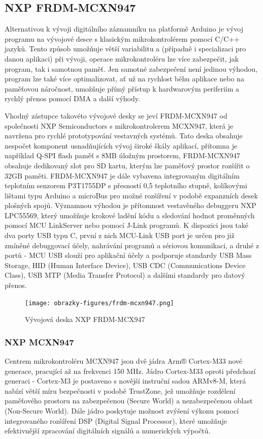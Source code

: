 \subsection{NXP FRDM-MCXN947}
\label{nxp_frdm_mcxn947}
Alternativou k vývoji digitálního záznamníku na platformě Arduino je vývoj programu na vývojové desce s klasickým mikrokontrolérem pomocí C/C++ jazyků. Tento způsob umožňuje větší variabilitu a (případně i specializaci pro danou aplikaci) při vývoji, operace mikrokontroléru lze více zabezpečit, jak program, tak i samotnou paměť. Jen samotné zabezpečení není jedinou výhodou, program lze také více optimalizovat, ať už na rychlost běhu aplikace nebo na paměťovou náročnost, umožňuje přímý přístup k hardwarovým periferiím a rychlý přenos pomocí DMA a další výhody.

Vhodný zástupce takovéto vývojové desky se jeví FRDM-MCXN947 od společnosti NXP Semiconductors s mikrokontrolerem MCXN947, která je navržena pro rychlé prototypování vestavných systémů. Tato deska obsahuje nespočet komponent usnadňujících vývoj široké škály aplikací, přítomna je například Q-SPI flash paměť s 8MB úložným prostorem, FRDM-MCXN947 obsahuje dedikovaný slot pro SD kartu, kterým lze paměťový prostor rozšířit o 32GB paměti. FRDM-MCXN947 je dále vybavena integrovaným digitálním teplotním senzorem P3T1755DP s přesností 0,5 teplotního stupně, kolíkovými lištami typu Arduino a microBus pro možné rozšíření v podobě expanzních desek plošných spojů. Významnou výhodou je přítomnost vestavěného debuggeru NXP LPC55569, který umožňuje krokové ladění kódu a sledování hodnot proměnných pomocí MCU LinkServer nebo pomocí J-Link programů. K dispozici jsou také dva porty USB typu C, první z nich MCU-Link USB port je určen pro již zmíněné debuggovací účely, nahrávání programů a sériovou komunikaci, a druhé z portů - MCU USB slouží pro aplikační účely a podporuje standardy USB Mass Storage, HID (Human Interface Device), USB CDC (Communications Device Class), USB MTP (Media Transfer Protocol) a dalšími standardy pro datový přenos. \cite{nxp_MCX_Nx4x_Reference_Manual, nxp_FRDM_MCXN947_getting_started}

\begin{figure}[h]
    \centering
    \texttt{[image: obrazky-figures/frdm-mcxn947.png]}
    
    \caption{Vývojová deska NXP FRDM-MCX947 \cite{nxp_FRDM_MCXN947_getting_started}}
    \label{fig:frdm-mcxn947}
\end{figure}

\subsubsection{NXP MCXN947}
Centrem mikrokontroléru MCXN947 jsou dvě jádra Arm® Cortex-M33 nové generace, pracující až na frekvenci 150 MHz. Jádro Cortex-M33 oproti předchozí generaci - Cortex-M3 je postaveno s novější instruční sadou ARMv8-M, která nabízí větší míru bezpečnosti v podobě TrustZone, jež umožňuje rozdělení paměťového prostoru na zabezpečenou (Secure World) a nezabezpečenou oblast (Non-Secure World). Dále jádro poskytuje možnost zvýšení výkonu pomocí integrovaného rozšíření DSP (Digital Signal Processor), které umožňuje efektivnější zpracování digitálních signálů a numerických výpočtů. \cite{nxp_MCX_Nx4x_Reference_Manual}

